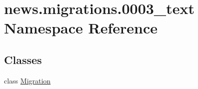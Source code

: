 \hypertarget{namespacenews_1_1migrations_1_10003__text}{}\section{news.\+migrations.0003\+\_\+text Namespace Reference}
\label{namespacenews_1_1migrations_1_10003__text}
\subsection*{Classes}
\begin{DoxyCompactItemize}
\item 
class \mbox{\hyperlink{classnews_1_1migrations_1_10003__text_1_1_migration}{Migration}}
\end{DoxyCompactItemize}
